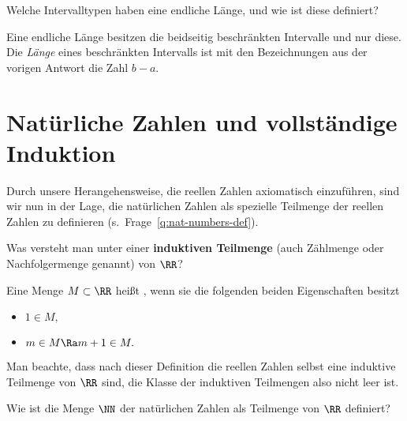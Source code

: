 \begin{frage}
  Welche Intervalltypen haben eine endliche Länge, und wie ist diese 
  definiert?
\end{frage}

\begin{antwort}
  Eine endliche Länge besitzen die beidseitig beschränkten  
  Intervalle und nur diese. Die \textit{Länge} 
  eines beschränkten Intervalls ist mit den Bezeichnungen aus der 
  vorigen Antwort die Zahl $b-a$. 
  \AntEnd
\end{antwort}

\section{Natürliche Zahlen und vollständige Induktion}

Durch unsere Herangehensweise, die reellen Zahlen axiomatisch 
einzuführen, sind wir nun in der Lage, die natürlichen Zahlen 
als spezielle Teilmenge der reellen Zahlen zu definieren 
(s.~Frage~\ref{q:nat-numbers-def}).

\begin{frage}
  Was versteht man unter einer \textbf{induktiven Teilmenge}
  (auch Zählmenge oder Nachfolgermenge genannt) von $\RR$?
\end{frage}

\begin{antwort}
  Eine Menge $M \subset \RR$ heißt , wenn sie die folgenden 
  beiden Eigenschaften besitzt
  \begin{itemize}[2mm]
  \item[\desc{i}] $1\in M, $
  \item[\desc{ii}] $m \in M \Ra m+1\in M.$
  \end{itemize}
  Man beachte, dass nach dieser Definition die reellen Zahlen selbst 
  eine induktive Teilmenge von $\RR$ sind, 
  die Klasse der induktiven Teilmengen 
  also nicht leer ist.
  \AntEnd
\end{antwort}



\begin{frage}
  \label{q:nat-numbers-def}
  Wie ist die Menge $\NN$ der natürlichen Zahlen als Teilmenge von $\RR$ 
  definiert?
\end{frage}

